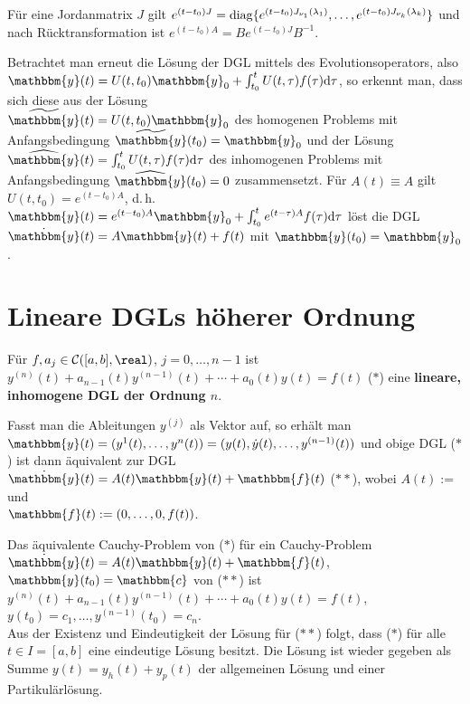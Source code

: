 Für eine Jordanmatrix $J$ gilt
$e^{(t - t_0) J} = \operatorname{diag}\{e^{(t - t_0) J_{\nu_1}(\lambda_1)}, \dotsc,
e^{(t - t_0) J_{\nu_k}(\lambda_k)}\}$
und nach Rücktransformation ist
$e^{(t - t_0) A} = B e^{(t - t_0) J} B^{-1}$.

\linie

Betrachtet man erneut die Lösung der DGL mittels des Evolutionsoperators,
also \\
$\mathbbm{y}(t) = U(t, t_0) \mathbbm{y}_0 +
\int_{t_0}^t U(t, \tau) f(\tau) \d\tau$,
so erkennt man, dass sich diese aus der Lösung \\
$\widetilde{\mathbbm{y}}(t) = U(t, t_0) \mathbbm{y}_0$
des homogenen Problems mit Anfangsbedingung
$\widetilde{\mathbbm{y}}(t_0) = \mathbbm{y}_0$ und der Lösung \\
$\widehat{\mathbbm{y}}(t) = \int_{t_0}^t U(t, \tau) f(\tau) \d\tau$
des inhomogenen Problems mit
Anfangsbedingung $\widehat{\mathbbm{y}}(t_0) = 0$ zusammensetzt.
Für $A(t) \equiv A$ gilt $U(t, t_0) = e^{(t - t_0) A}$, d.\,h.
$\mathbbm{y}(t) = e^{(t - t_0) A} \mathbbm{y}_0 +
\int_{t_0}^t e^{(t - \tau) A} f(\tau) \d\tau$
löst die DGL $\dot{\mathbbm{y}}(t) = A \mathbbm{y}(t) + f(t)$
mit $\mathbbm{y}(t_0) = \mathbbm{y}_0$.

\section{%
    Lineare DGLs höherer Ordnung%
}

Für $f, a_j \in \C([a, b], \real)$, $j = 0, \dotsc, n - 1$ ist
$y^{(n)}(t) + a_{n-1}(t) y^{(n-1)}(t) + \dotsb + a_0(t) y(t) = f(t)$ ($\ast$)
eine \textbf{lineare, inhomogene DGL der Ordnung $n$}.

Fasst man die Ableitungen $y^{(j)}$ als Vektor auf, so erhält man \\
$\mathbbm{y}(t) = (y^1(t), \dotsc, y^n(t)) =
(y(t), \dot{y}(t), \dotsc, y^{(n-1)}(t))$
und obige DGL ($\ast$) ist dann äquivalent zur DGL
$\dot{\mathbbm{y}}(t) = A(t) \mathbbm{y}(t) + \mathbbm{f}(t)$ ($\ast\ast$),
wobei $A(t) := $  und \\
$\mathbbm{f}(t) := (0, \dotsc, 0, f(t))$.

Das äquivalente Cauchy-Problem von ($\ast$) für ein Cauchy-Problem \\
$\dot{\mathbbm{y}}(t) = A(t) \mathbbm{y}(t) + \mathbbm{f}(t)$,
$\mathbbm{y}(t_0) = \mathbbm{c}$ von ($\ast\ast$) ist \\
$y^{(n)}(t) + a_{n-1}(t) y^{(n-1)}(t) + \dotsb + a_0(t) y(t) = f(t)$,
$y(t_0) = c_1, \dotsc, y^{(n-1)}(t_0) = c_n$. \\
Aus der Existenz und Eindeutigkeit der Lösung für ($\ast\ast$) folgt,
dass ($\ast$) für alle $t \in I = [a, b]$ eine eindeutige Lösung besitzt.
Die Lösung ist wieder gegeben als Summe
$y(t) = y_h(t) + y_p(t)$
der allgemeinen Lösung und einer Partikulärlösung.


